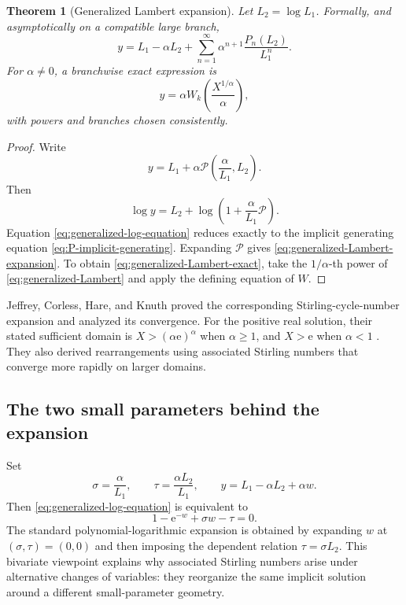 \documentclass[11pt]{article}
\theoremstyle{pltheorem}
\newtheorem{theorem}{Theorem}[section]
\newcommand{\e}{\mathrm e}
\begin{document}
\begin{theorem}[Generalized Lambert expansion]\label{thm:generalized-Lambert}
Let \(L_2=\log L_1\).  Formally, and asymptotically on a compatible large branch,
\begin{equation}\label{eq:generalized-Lambert-expansion}
 \boxed{\quad
 y=L_1-\alpha L_2
 +\sum_{n=1}^{\infty}
 \alpha^{n+1}\frac{P_n(L_2)}{L_1^n}.
 \quad}
\end{equation}
For \(\alpha\ne0\), a branchwise exact expression is
\begin{equation}\label{eq:generalized-Lambert-exact}
 y=\alpha W_k\!\left(\frac{X^{1/\alpha}}{\alpha}\right),
\end{equation}
with powers and branches chosen consistently.
\end{theorem}

\begin{proof}
Write
\[
 y=L_1+\alpha\mathcal P\!\left(\frac{\alpha}{L_1},L_2\right).
\]
Then
\[
 \log y=L_2+\log\left(1+\frac{\alpha}{L_1}\mathcal P\right).
\]
Equation \cref{eq:generalized-log-equation} reduces exactly to the implicit generating equation
\cref{eq:P-implicit-generating}.  Expanding \(\mathcal P\) gives
\cref{eq:generalized-Lambert-expansion}.  To obtain
\cref{eq:generalized-Lambert-exact}, take the \(1/\alpha\)-th power of \cref{eq:generalized-Lambert} and apply the defining equation of \(W\).
\end{proof}

Jeffrey, Corless, Hare, and Knuth proved the corresponding Stirling-cycle-number expansion and analyzed its convergence.  For the positive real solution, their stated sufficient domain is
\(X>(\alpha\e)^\alpha\) when \(\alpha\ge1\), and \(X>\e\) when \(\alpha<1\) \cite{jeffrey-et-al-1995}.  They also derived rearrangements using associated Stirling numbers that converge more rapidly on larger domains.

\subsection{The two small parameters behind the expansion}

Set
\begin{equation}\label{eq:sigma-tau}
 \sigma=\frac{\alpha}{L_1},
 \qquad
 \tau=\frac{\alpha L_2}{L_1},
 \qquad
 y=L_1-\alpha L_2+\alpha w.
\end{equation}
Then \cref{eq:generalized-log-equation} is equivalent to
\begin{equation}\label{eq:w-sigma-tau}
 1-\e^{-w}+\sigma w-\tau=0.
\end{equation}
The standard polynomial-logarithmic expansion is obtained by expanding \(w\) at
\((\sigma,\tau)=(0,0)\) and then imposing the dependent relation
\(\tau=\sigma L_2\).  This bivariate viewpoint explains why associated Stirling numbers arise under alternative changes of variables: they reorganize the same implicit solution around a different small-parameter geometry.
\end{document}
